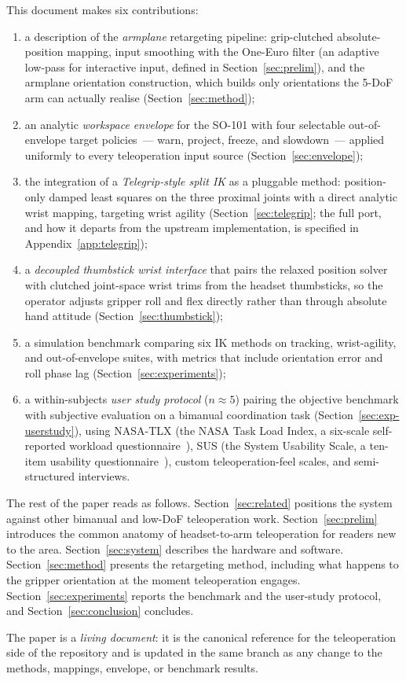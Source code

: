 This document makes six contributions:
\begin{enumerate}
  \item a description of the \emph{armplane} retargeting pipeline:
        grip-clutched absolute-position mapping, input smoothing with
        the One-Euro filter (an adaptive low-pass for interactive
        input, defined in Section~\ref{sec:prelim}), and the armplane
        orientation construction, which builds only orientations the
        5-DoF arm can actually realise (Section~\ref{sec:method});
  \item an analytic \emph{workspace envelope} for the SO-101 with four
        selectable out-of-envelope target policies~--- warn, project,
        freeze, and slowdown~--- applied uniformly to every
        teleoperation input source (Section~\ref{sec:envelope});
  \item the integration of a \emph{Telegrip-style split IK}
        \citep{telegrip} as a pluggable method: position-only damped
        least squares on the three proximal joints with a direct
        analytic wrist mapping, targeting wrist agility
        (Section~\ref{sec:telegrip}; the full port, and how it departs
        from the upstream implementation, is specified in
        Appendix~\ref{app:telegrip});
  \item a \emph{decoupled thumbstick wrist interface} that pairs the
        relaxed position solver with clutched joint-space wrist trims
        from the headset thumbsticks, so the operator adjusts gripper
        roll and flex directly rather than through absolute hand
        attitude (Section~\ref{sec:thumbstick});
  \item a simulation benchmark comparing six IK methods on tracking,
        wrist-agility, and out-of-envelope suites, with metrics that
        include orientation error and roll phase lag
        (Section~\ref{sec:experiments});
  \item a within-subjects \emph{user study protocol} (\(n\approx 5\))
        pairing the objective benchmark with subjective evaluation on a
        bimanual coordination task (Section~\ref{sec:exp-userstudy}),
        using NASA-TLX (the NASA Task Load Index, a six-scale
        self-reported workload questionnaire~\citep{nasatlx}), SUS (the
        System Usability Scale, a ten-item usability
        questionnaire~\citep{sus}), custom teleoperation-feel scales,
        and semi-structured interviews.
\end{enumerate}

The rest of the paper reads as follows. Section~\ref{sec:related}
positions the system against other bimanual and low-DoF teleoperation
work. Section~\ref{sec:prelim} introduces the common anatomy of
headset-to-arm teleoperation for readers new to the area.
Section~\ref{sec:system} describes the hardware and software.
Section~\ref{sec:method} presents the retargeting method, including what
happens to the gripper orientation at the moment teleoperation engages.
Section~\ref{sec:experiments} reports the benchmark and the user-study
protocol, and Section~\ref{sec:conclusion} concludes.

The paper is a \emph{living document}: it is the canonical reference for
the teleoperation side of the repository and is updated in the same
branch as any change to the methods, mappings, envelope, or benchmark
results.

